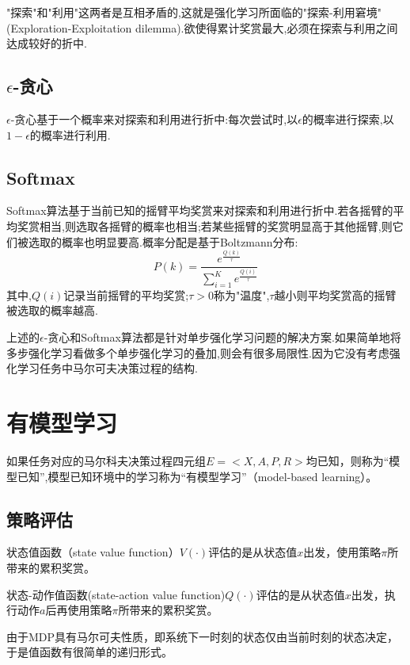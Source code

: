"探索"和"利用"这两者是互相矛盾的,这就是强化学习所面临的"探索-利用窘境"(Exploration-Exploitation dilemma).欲使得累计奖赏最大,必须在探索与利用之间达成较好的折中.

\subsection{$\epsilon$-贪心}

$\epsilon$-贪心基于一个概率来对探索和利用进行折中:每次尝试时,以$\epsilon$的概率进行探索,以$1-\epsilon$的概率进行利用.

\subsection{Softmax}

Softmax算法基于当前已知的摇臂平均奖赏来对探索和利用进行折中.若各摇臂的平均奖赏相当,则选取各摇臂的概率也相当;若某些摇臂的奖赏明显高于其他摇臂,则它们被选取的概率也明显要高.概率分配是基于Boltzmann分布:
$$P(k)=\frac{e^\frac{Q(k)}{\tau}}{\sum_{i=1}^Ke^\frac{Q(i)}{\tau}}$$
其中,$Q(i)$记录当前摇臂的平均奖赏;$\tau>0$称为"温度",$\tau$越小则平均奖赏高的摇臂被选取的概率越高.

上述的$\epsilon$-贪心和Softmax算法都是针对单步强化学习问题的解决方案.如果简单地将多步强化学习看做多个单步强化学习的叠加,则会有很多局限性.因为它没有考虑强化学习任务中马尔可夫决策过程的结构.

\section{有模型学习}

如果任务对应的马尔科夫决策过程四元组$E=<X,A,P,R>$均已知，则称为“模型已知”,模型已知环境中的学习称为“有模型学习”（model-based learning）。

\subsection{策略评估}

状态值函数（state value function）$V(\cdot)$评估的是从状态值$x$出发，使用策略$\pi$所带来的累积奖赏。

状态-动作值函数(state-action value function)$Q(\cdot)$评估的是从状态值$x$出发，执行动作$a$后再使用策略$\pi$所带来的累积奖赏。

由于MDP具有马尔可夫性质，即系统下一时刻的状态仅由当前时刻的状态决定，于是值函数有很简单的递归形式。

